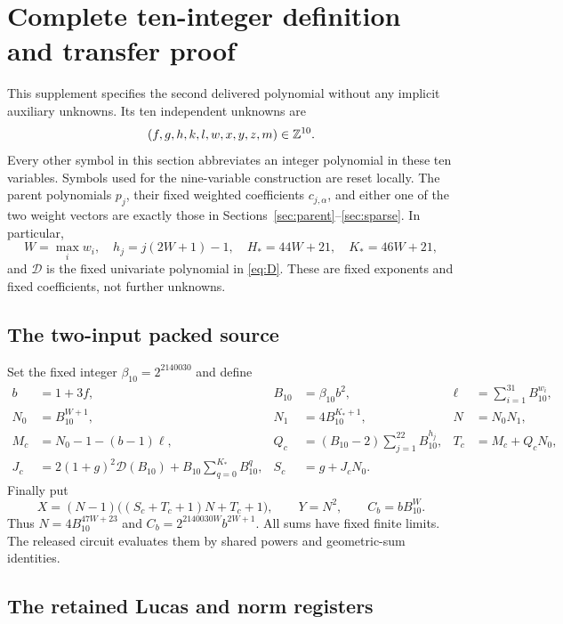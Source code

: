 \section{Complete ten-integer definition and transfer proof}
\label{sec:ten-supplement}

This supplement specifies the second delivered polynomial without any
implicit auxiliary unknowns.  Its ten independent unknowns are
\[
 (f,g,h,k,l,w,x,y,z,m)\in\mathbb Z^{10}.
\]
Every other symbol in this section abbreviates an integer polynomial in
these ten variables.  Symbols used for the nine-variable construction
are reset locally.  The parent polynomials $p_j$, their fixed weighted
coefficients $c_{j,\alpha}$, and either one of the two weight vectors
are exactly those in Sections~\ref{sec:parent}--\ref{sec:sparse}.
In particular,
\[
 W=\max_iw_i,\quad h_j=j(2W+1)-1,\quad
 H_*=44W+21,\quad K_*=46W+21,
\]
and $\mathcal D$ is the fixed univariate polynomial in
\eqref{eq:D}.  These are fixed exponents and fixed coefficients,
not further unknowns.

\subsection{The two-input packed source}

Set the fixed integer $\beta_{10}=2^{2140030}$ and define
\begin{align*}
 b&=1+3f,& B_{10}&=\beta_{10}b^2,
 &\ell&=\sum_{i=1}^{31}B_{10}^{w_i},\\
 N_0&=B_{10}^{W+1},&N_1&=4B_{10}^{K_*+1},&N&=N_0N_1,\\
 M_c&=N_0-1-(b-1)\ell,
 &Q_c&=(B_{10}-2)\sum_{j=1}^{22}B_{10}^{h_j},
 &T_c&=M_c+Q_cN_0,\\
 J_c&=2(1+g)^2\mathcal D(B_{10})+
                B_{10}\sum_{q=0}^{K_*}B_{10}^{q},
 &S_c&=g+J_cN_0.
\end{align*}
Finally put
\[
 X=(N-1)\bigl((S_c+T_c+1)N+T_c+1\bigr),\qquad
 Y=N^2,\qquad C_b=bB_{10}^{W}.
\]
Thus $N=4B_{10}^{47W+23}$ and
$C_b=2^{2140030W}b^{2W+1}$.
All sums have fixed finite limits.  The released circuit evaluates them
by shared powers and geometric-sum identities.

\subsection{The retained Lucas and norm registers}

